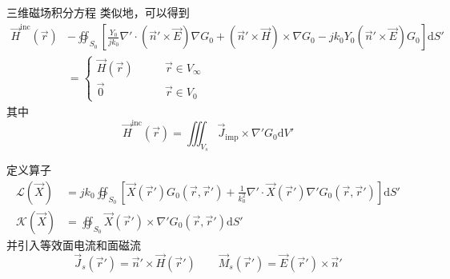 \begin{theorem}{三维磁场积分方程}
    类似地，可以得到
    \begin{equation}
        \begin{aligned}
            \vec{H}^{\text{inc}}(\vec{r})
            &-\oiint_{S_0} \left[
                \frac{Y_0}{jk_0}\nabla'\cdot(\vec{n}'\times\vec{E})\nabla G_0
                +(\vec{n}'\times \vec{H})\times\nabla G_0
                -jk_0Y_0(\vec{n}'\times\vec{E})G_0
            \right]\text{d}S'\\
            &=\left\{
                \begin{aligned}
                    \vec{H}(\vec{r}) \qquad &\vec{r} \in V_{\infty} \\
                    \vec{0} \ \ \ \qquad &\vec{r} \in V_{0}
                \end{aligned}
            \right.
        \end{aligned}
        \label{三维磁场积分方程}
    \end{equation}
    其中
    \begin{equation}
        \vec{H}^{\text{inc}}(\vec{r})
        =\iiint_{V_s}\vec{J}_{\text{imp}}\times\nabla' G_0\text{d}V'
    \end{equation}
\end{theorem}

\begin{definition}
    定义算子
    \begin{align}
        \label{矩量法算子定义-1}
        \mathcal{L}(\vec{X})
        &=jk_0\oiint_{S_0} \left[
            \vec{X}(\vec{r}')G_0(\vec{r}, \vec{r}')
            +\frac{1}{k_0^2}\nabla' \cdot \vec{X}(\vec{r}')
            \nabla' G_0(\vec{r}, \vec{r}')
        \right]\text{d}S'\\
        \label{矩量法算子定义-2}
        \mathcal{K}(\vec{X})
        &=\oiint_{S_0}
            \vec{X}(\vec{r}')\times\nabla' G_0(\vec{r}, \vec{r}')
        \text{d}S'
    \end{align}
    并引入等效面电流和面磁流
    \begin{equation}
        \vec{J}_s(\vec{r}')
        =\vec{n}'\times\vec{H}(\vec{r}')
        \qquad
        \vec{M}_s(\vec{r}')
        =\vec{E}(\vec{r}')\times\vec{n}'
    \end{equation}
\end{definition}

